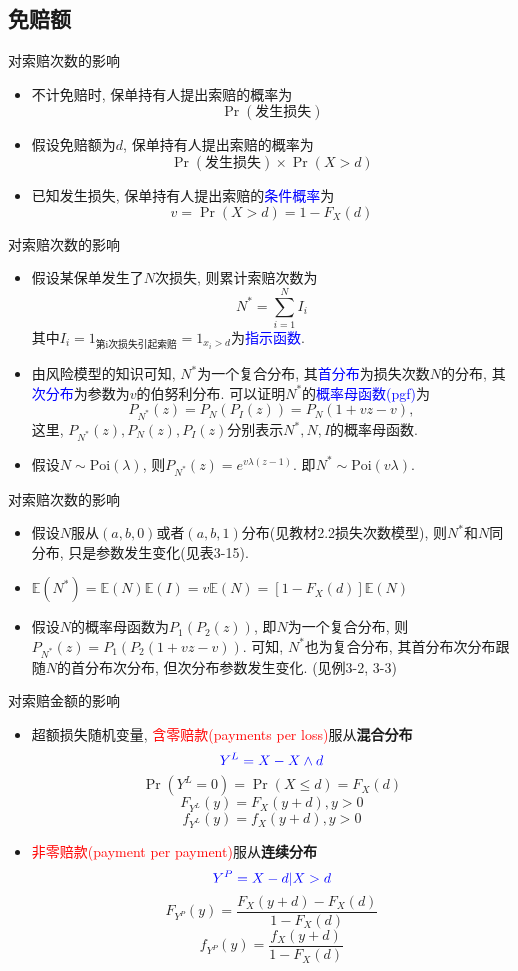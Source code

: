 \documentclass[professionalfont]{beamer}
\def\E{{\mathbb E}}  %
\newcommand{\red}[1]{\textcolor{red}{#1}}
\newcommand{\green}[1]{\textbf{#1}}
\newcommand{\blue}[1]{\textcolor{blue}{#1}}
\begin{document}
\subsection{免赔额}
\begin{frame}{对索赔次数的影响}
	\begin{itemize}
		\item 不计免赔时, 保单持有人提出索赔的概率为
		\green{$$\Pr(\text{发生损失})$$}
		\item 假设免赔额为$d$, 保单持有人提出索赔的概率为
		\green{$$\Pr(\text{发生损失})\times\Pr(X>d)$$}
		\item 已知发生损失, 保单持有人提出索赔的\blue{条件概率}为
		\green{$$v=\Pr(X>d)=1-F_X(d)$$}
	\end{itemize}
\end{frame}
\begin{frame}{对索赔次数的影响}
	\begin{itemize}
		\item 	假设某保单发生了$N$次损失, 则累计索赔次数为
	$$N^*=\sum_{i=1}^{N}I_i$$
	其中$I_i=1_\text{第i次损失引起索赔}=1_{x_i>d}$为\blue{指示函数}.\
	\item 由风险模型的知识可知, $N^*$为一个复合分布, 其\blue{首分布}为损失次数$N$的分布, 其\blue{次分布}为参数为$v$的伯努利分布. 可以证明$N^*$的\blue{概率母函数(pgf)}为
	$$P_{N^*}(z)=P_{N}(P_I(z))=P_N(1+vz-v),$$
	这里, $P_{N^*}(z), P_{N}(z), P_I(z)$分别表示$N^*, N, I$的概率母函数.
		\item 假设$N\sim \text{Poi}(\lambda)$, 则$P_{N^*}(z)=e^{v\lambda(z-1)}$. 即$N^*\sim \text{Poi}(v\lambda)$.
	
	\end{itemize}
\end{frame}
\begin{frame}{对索赔次数的影响}
	\begin{itemize}
	\item 假设$N$服从$(a,b,0)$或者$(a,b,1)$分布(见教材2.2损失次数模型), 则$N^*$和$N$同分布, 只是参数发生变化(见表3-15). 
	\item $\E(N^*)=\E(N)\E(I)=v\E(N)=\left[1-F_X(d)\right]\E(N)$
		\item 假设$N$的概率母函数为$P_1(P_2(z))$, 即$N$为一个复合分布, 则$P_{N^*}(z)=P_1(P_2(1+vz-v))$. 可知, $N^*$也为复合分布, 其首分布次分布跟随$N$的首分布次分布, 但次分布参数发生变化. (见例3-2, 3-3)
	\end{itemize}
\end{frame}
\begin{frame}{对索赔金额的影响}
	\begin{itemize}
		\item 超额损失随机变量, \red{含零赔款(payments per loss)}服从\green{混合分布} 
		$$\blue{Y^L=X-X\wedge d}$$
		$$\Pr(Y^L=0)=\Pr(X\le d)=F_X(d)$$
		$$F_{Y^L}(y)=F_X(y+d),y>0$$  $$f_{Y^L}(y)=f_X(y+d), y>0$$
		\item \red{非零赔款(payment per payment)}服从\green{连续分布} $$\blue{Y^P=X-d|X>d}$$
		$$F_{Y^P}(y)=\frac{F_X(y+d)-F_X(d)}{1-F_X(d)}$$
		$$f_{Y^P}(y)=\frac{f_X(y+d)}{1-F_X(d)}$$
	\end{itemize}
\end{frame}
\end{document}
